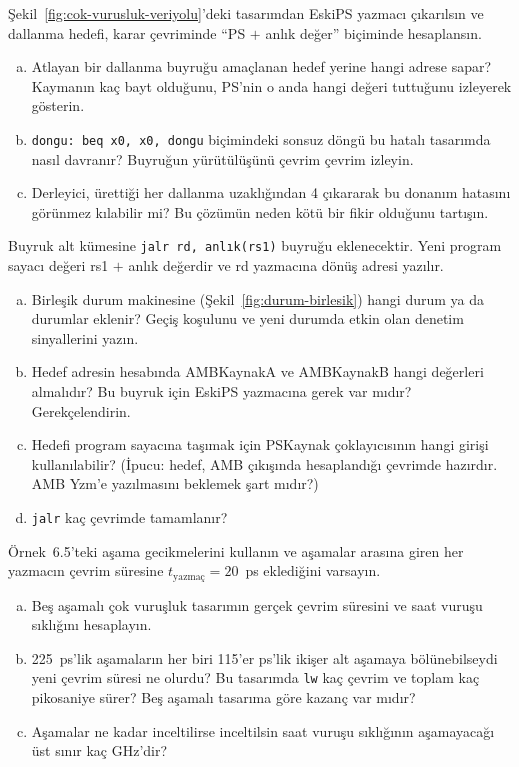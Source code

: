 \begin{alistirma}[\orta]
Şekil~\ref{fig:cok-vurusluk-veriyolu}'deki tasarımdan EskiPS yazmacı çıkarılsın ve dallanma hedefi, karar çevriminde ``PS $+$ anlık değer'' biçiminde hesaplansın.
\begin{enumerate}[(a)]
    \item Atlayan bir dallanma buyruğu amaçlanan hedef yerine hangi adrese sapar? Kaymanın kaç bayt olduğunu, PS'nin o anda hangi değeri tuttuğunu izleyerek gösterin.
    \item \texttt{dongu: beq x0, x0, dongu} biçimindeki sonsuz döngü bu hatalı tasarımda nasıl davranır? Buyruğun yürütülüşünü çevrim çevrim izleyin.
    \item Derleyici, ürettiği her dallanma uzaklığından 4 çıkararak bu donanım hatasını görünmez kılabilir mi? Bu çözümün neden kötü bir fikir olduğunu tartışın.
\end{enumerate}
\end{alistirma}

\begin{alistirma}[\orta]
Buyruk alt kümesine \texttt{jalr rd, anlık(rs1)} buyruğu eklenecektir. Yeni program sayacı değeri rs1 $+$ anlık değerdir ve rd yazmacına dönüş adresi yazılır.
\begin{enumerate}[(a)]
    \item Birleşik durum makinesine (Şekil~\ref{fig:durum-birlesik}) hangi durum ya da durumlar eklenir? Geçiş koşulunu ve yeni durumda etkin olan denetim sinyallerini yazın.
    \item Hedef adresin hesabında AMBKaynakA ve AMBKaynakB hangi değerleri almalıdır? Bu buyruk için EskiPS yazmacına gerek var mıdır? Gerekçelendirin.
    \item Hedefi program sayacına taşımak için PSKaynak çoklayıcısının hangi girişi kullanılabilir? (İpucu: hedef, AMB çıkışında hesaplandığı çevrimde hazırdır. AMB Yzm'e yazılmasını beklemek şart mıdır?)
    \item \texttt{jalr} kaç çevrimde tamamlanır?
\end{enumerate}
\end{alistirma}

\begin{alistirma}[\orta]
Örnek~6.5'teki aşama gecikmelerini kullanın ve aşamalar arasına giren her yazmacın çevrim süresine $t_{\text{yazmaç}} = 20$~ps eklediğini varsayın.
\begin{enumerate}[(a)]
    \item Beş aşamalı çok vuruşluk tasarımın gerçek çevrim süresini ve saat vuruşu sıklığını hesaplayın.
    \item 225~ps'lik aşamaların her biri 115'er ps'lik ikişer alt aşamaya bölünebilseydi yeni çevrim süresi ne olurdu? Bu tasarımda \texttt{lw} kaç çevrim ve toplam kaç pikosaniye sürer? Beş aşamalı tasarıma göre kazanç var mıdır?
    \item Aşamalar ne kadar inceltilirse inceltilsin saat vuruşu sıklığının aşamayacağı üst sınır kaç GHz'dir?
\end{enumerate}
\end{alistirma}

